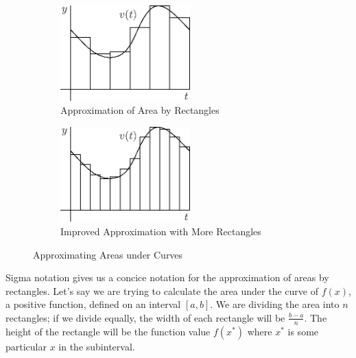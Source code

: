 \documentclass[fleqn]{report}
\begin{document}
\begin{figure}[t]
\centering
\begin{subfigure}{.5\textwidth}
 \centering
 \includegraphics[width=5cm]{figure16.eps}
 \caption{Approximation of Area by Rectangles}
\end{subfigure}%
\begin{subfigure}{.5\textwidth}
 \centering
 \includegraphics[width=5cm]{figure17.eps}
 \caption{Improved Approximation with More Rectangles}
\end{subfigure}
\caption{Approximating Areas under Curves}
\label{figure-approximating-areas2}
\end{figure}

Sigma notation gives us a concice notation for the
approximation of areas by rectangles. Let's say we are trying
to calculate the area under the curve of $f(x)$, a positive
function, defined on an interval $[a,b]$. We are
dividing the area into $n$ rectangles; if we divide equally,
the width of each rectangle will be $\frac{b-a}{n}$. The
height of the rectangle will be the function value $f(x^*)$
where $x^*$ is some particular $x$ in the subinterval.
\end{document}
